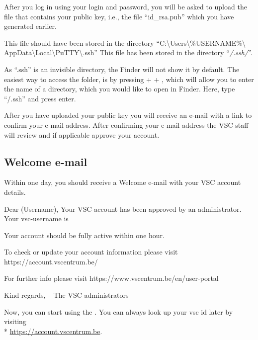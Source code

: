 \fi


After you log in using your \university login and password,
you will be asked to upload the file that contains
your public key, i.e., the file ``id\_rsa.pub'' which you have
generated earlier.

\ifwindows
  This file should have been stored in the directory
  ``C:\textbackslash Users\textbackslash \%USERNAME\%\textbackslash
  AppData\textbackslash Local\textbackslash PuTTY\textbackslash .ssh''
\fi
\ifmacORlinux
  This file has been stored in the directory ``\emph{\tilde/.ssh/}''.
\fi

\ifmac
\begin{tip}
  As ``.ssh'' is an invisible directory, the Finder will
  not show it by default. The easiest way to access the folder, is by pressing
   +  + , which will allow you to enter the name of a directory, which
  you would like to open in Finder. Here, type ``\tilde/.ssh'' and press enter.
\end{tip}
\fi

After you have uploaded your public key you will receive an e-mail with a link to
confirm your e-mail address. After confirming your e-mail address the VSC staff will
review and if applicable approve your account.

\subsection{Welcome e-mail}
\label{sec:welcome-email}

Within one day, you should receive a Welcome e-mail with your VSC account details.

\begin{flattext}
Dear (Username),
Your VSC-account has been approved by an administrator.
Your vsc-username is %

Your account should be fully active within one hour.

To check or update your account information please visit
https://account.vscentrum.be/

For further info please visit https://www.vscentrum.be/en/user-portal

Kind regards,
-- The VSC administrators
\end{flattext}

Now, you can start using the \hpc. You can always look up your vsc id later by visiting\\*
\url{https://account.vscentrum.be}.

